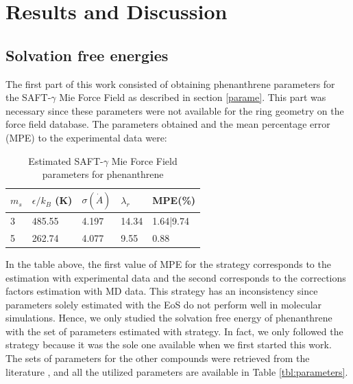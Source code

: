 \chapter{Results and Discussion} %

\label{Chapter5} %

\section{Solvation free energies}

The first part of this work consisted of obtaining phenanthrene parameters for the SAFT-$\gamma$ Mie Force Field as described in section \ref{parame}. This part was necessary since these parameters were not available for the ring geometry on the force field database. The parameters obtained and the mean percentage error (MPE) to the experimental data \cite{pvphen} were:

\begin{table}[h]
    \centering
    \caption{Estimated SAFT-$\gamma$ Mie Force Field parameters for phenanthrene}
    \label{tbl:estimparameters}
    \begin{tabular}{lllll}
        \hline
        \hline
         $m_s$ & $\epsilon/k_{B}$ (K) & $\sigma (\dot{A})$ & $\lambda_r$& MPE(\%) \\ \hline
         3 \cite{lafitte2012}    & 485.55              & 4.197              & 14.34 & 1.64|9.74       \\ 
         5  \cite{muller2017}   & 262.74               & 4.077              & 9.55   &  0.88   \\ 
         \hline
         \hline
    \end{tabular}
    
\end{table} 

In the table above, the first value of MPE for the  strategy corresponds to the estimation with experimental data and the second corresponds to the corrections factors estimation with MD data. This strategy has an inconsistency since parameters solely estimated with the EoS do not perform well in molecular simulations. Hence, we only studied the solvation free energy of phenanthrene with the set of parameters estimated with  strategy. In fact, we only followed the \cite{lafitte2012} strategy because it was the sole one available when we first started this work. The sets of parameters for the other compounds were retrieved from the literature \cite{lobanova2016,herdes2015,ervik2016,muller2017}, and all the utilized parameters are available in Table \ref{tbl:parameters}.

